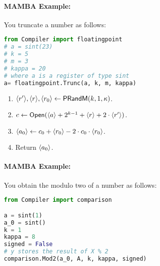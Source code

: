 \paragraph{MAMBA Example:} You truncate a number as follows: 
\begin{lstlisting}[language={python}]
from Compiler import floatingpoint
# a = sint(23)
# k = 5
# m = 3 
# kappa = 20
# where a is a register of type sint
a= floatingpoint.Trunc(a, k, m, kappa)
\end{lstlisting}

\begin{enumerate}
\item $\langle r' \rangle, \langle r \rangle, \langle r_0 \rangle \leftarrow \mathsf{PRandM}(k,1,\kappa)$.
\item $c \leftarrow {\mathsf{Open}}(\langle a \rangle+2^{k-1}+\langle r \rangle+2 \cdot \langle r' \rangle)$.
\item $\langle a_0 \rangle \leftarrow c_0+\langle r_0 \rangle-2 \cdot c_0 \cdot \langle r_0 \rangle$.
\item Return $\langle a_0 \rangle$.
\end{enumerate}

\paragraph{MAMBA Example:} You obtain the modulo two of a number as follows: 
\begin{lstlisting}[language={python}]
from Compiler import comparison

a = sint(1)
a_0 = sint()
k = 1
kappa = 8
signed = False 
# y stores the result of X % 2
comparison.Mod2(a_0, A, k, kappa, signed)
\end{lstlisting}

\iffalse
\note{Nigel}{Does not seem to be used anywhere}
\msubsubsection{$\mathsf{Mod}(\sshare{a},k,x)$:}
Given $a \in \Zk$ and public $x \in [1,\ldots,2^{k-1}-1]$
this computes $\sshare{a \pmod{x}}$.
\begin{enumerate}
\item $m \asn \ceil{\log_2 x }$.
\item $\sshare{r'}, \sshare{r}, \sshare{r}_B \asn \mathsf{PRandM}(k,m,\kappa)$.
\item $c \asn \Open(\sshare{a}+2^{k-1}+\sshare{r}+x \cdot \sshare{r'})$.
\item $c' \asn c \pmod{x}$.
\item $\sshare{v} \asn 1 -\mathsf{BitLT}(\sshare{r}_B,x)$.
\item $\sshare{u} \asn \mathsf{LTZ}(c' - \sshare{r} + x \cdot \sshare{v},m)$.
\item $\sshare{a'} \asn c' - \sshare{r} + x \cdot ( \sshare{v}+\sshare{u})$.
\item Return $\sshare{a'}$.
\end{enumerate}
\fi

